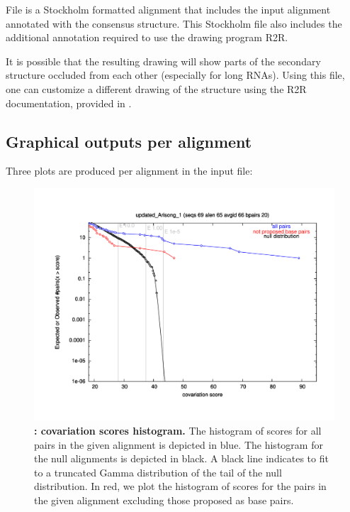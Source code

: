 File  is a Stockholm
formatted alignment that includes the input alignment annotated with
the consensus structure. This Stockholm file also includes the
additional annotation required to use the drawing program R2R.

It is possible that the resulting drawing will show parts of the
secondary structure occluded from each other (especially for long
RNAs).  Using this file, one can customize a different drawing of the
structure using the R2R documentation, provided in
.


\subsection{Graphical outputs per alignment}
Three plots are produced per alignment in the input file: 

\begin{figure}
  \includegraphics[scale=0.50]{Arisong_his.pdf} 
\caption{\small\textbf{:
    covariation scores histogram.}  The histogram of scores for all
  pairs in the given alignment is depicted in blue. The histogram for
  the null alignments is depicted in black. A black line indicates to
  fit to a truncated Gamma distribution of the tail of the null
  distribution. In red, we plot the histogram of scores for the pairs
  in the given alignment excluding those proposed as base pairs.}
\label{fig:histogram}
\end{figure}

